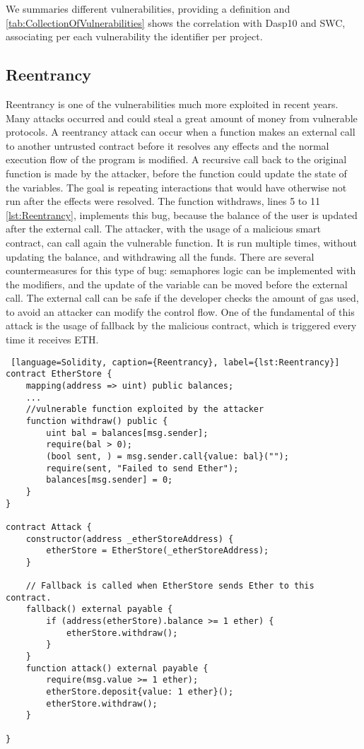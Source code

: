 \documentclass[a4paper,sigconf, language=french,
language=german, language=spanish, language=english]{acmart}
\begin{document}
We summaries different vulnerabilities, providing a definition and \autoref{tab:CollectionOfVulnerabilities} shows the correlation with Dasp10 and SWC, associating per each vulnerability the identifier per project.

\subsection{Reentrancy} 
Reentrancy is one of the vulnerabilities much more exploited in recent years. 
Many attacks occurred and could steal a great amount of money from vulnerable protocols. 
A reentrancy attack can occur when a function makes an external call to another untrusted contract before it resolves any effects and the normal execution flow of the program is modified.
A recursive call back to the original function is made by the attacker, before 
the function could update the state of the variables. 
The goal is repeating interactions that would have otherwise not run after the effects were resolved. 
The function withdraws, lines 5 to 11 \autoref{lst:Reentrancy}, implements this bug, because the balance of the user is updated after the external call. 
The attacker, with the usage of a malicious smart contract, can call again the vulnerable function. 
It is run multiple times, without updating the balance, and withdrawing all the funds. There are several countermeasures for this type of bug: 
semaphores logic can be implemented with the modifiers, and the update of the variable can be moved before the external call. 
The external call can be safe if the developer checks the amount of gas used, to avoid an attacker can modify the control flow. 
One of the fundamental of this attack is the usage of fallback by the malicious contract, which is triggered every time it receives ETH.

\begin{lstlisting} [language=Solidity, caption={Reentrancy}, label={lst:Reentrancy}]
contract EtherStore {
    mapping(address => uint) public balances;
    ...
    //vulnerable function exploited by the attacker
    function withdraw() public {
        uint bal = balances[msg.sender];
        require(bal > 0);
        (bool sent, ) = msg.sender.call{value: bal}("");
        require(sent, "Failed to send Ether");
        balances[msg.sender] = 0;
    }
}

contract Attack {
    constructor(address _etherStoreAddress) {
        etherStore = EtherStore(_etherStoreAddress);
    }

    // Fallback is called when EtherStore sends Ether to this contract.
    fallback() external payable {
        if (address(etherStore).balance >= 1 ether) {
            etherStore.withdraw();
        }
    }
    function attack() external payable {
        require(msg.value >= 1 ether);
        etherStore.deposit{value: 1 ether}();
        etherStore.withdraw();
    }

}
  
\end{lstlisting}
\end{document}
